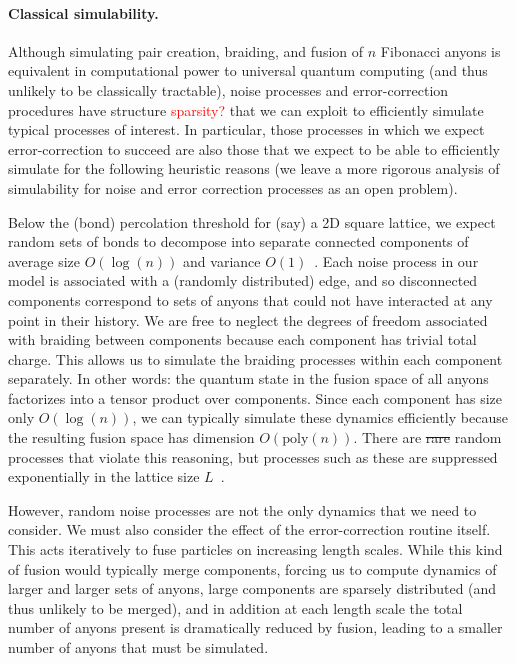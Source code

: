 \documentclass[aps, prl, letterpaper, twocolumn, superscriptaddress, notitlepage, 10pt]{revtex4}
\newcommand{\dude}[1]{\textcolor{red}{#1}}
\begin{document}
\paragraph{Classical simulability.}

Although simulating pair creation, braiding, and fusion of $n$ Fibonacci anyons is equivalent 
in computational power to universal quantum computing (and thus unlikely to be classically 
tractable), noise processes and error-correction procedures have structure \dude{sparsity?} that we can 
exploit to efficiently simulate typical processes of interest. In particular, those 
processes in which we expect error-correction to succeed are also those that we expect to 
be able to efficiently simulate for the following heuristic reasons 
(we leave a more rigorous analysis of simulability for noise 
and error correction processes as an open problem).

Below the (bond) percolation threshold for (say) a 2D square lattice, we expect random sets of 
bonds to decompose into separate connected components 
of average size $O(\log(n))$ and variance $O(1)$~\cite{Bazant2000}.
Each noise process in our model is associated with a (randomly distributed) edge, and so 
disconnected components correspond to sets of anyons that could not have interacted at any 
point in their history. 
We are free to neglect the degrees of freedom associated with braiding between components 
because each component has trivial total charge.
This allows us to simulate the braiding processes within each component separately. 
In other words: the quantum state in the fusion space of all anyons factorizes into 
a tensor product over components. 
Since each 
component has size only $O(\log(n))$, we can typically simulate these dynamics efficiently 
because the resulting fusion space has dimension $O(\mathrm{poly}(n))$. There are \sout{rare}
random processes that violate this reasoning, but processes such as these are suppressed 
exponentially in the lattice size $L$~\cite{Grimmett1989}. 

However, random noise processes are not the only dynamics that we need to consider. We 
must also consider the effect of the error-correction routine itself. This acts iteratively to fuse 
particles on increasing length scales. While this kind of fusion would typically merge components, 
forcing us to compute dynamics of larger and larger sets of anyons, large components are sparsely distributed 
(and thus unlikely to be merged), and in addition at each length scale the total number of 
anyons present is dramatically reduced by fusion, leading to a smaller number of anyons that 
must be simulated.
\end{document}
